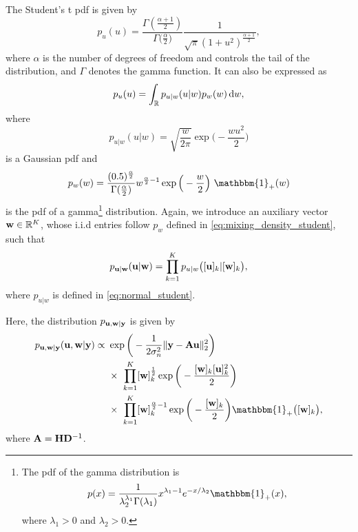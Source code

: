 \documentclass[journal]{IEEEtran}
\begin{document}
The Student's t pdf is given by 
\begin{equation}\label{eq:pdf_student}
    p_u(u) = \frac{\Gamma(\frac{\alpha+1}{2})}{\Gamma\big(\frac{\alpha}{2}\big)}\frac{1}{\sqrt{\pi}(1 + u^2)^{\frac{\alpha+1}{2}}},
\end{equation}
where $\alpha$ is the number of degrees of freedom and controls the tail of the distribution, and $\Gamma$ denotes the gamma function. It can also be expressed as 
\begin{equation}
    p_u(u) = \int_{\mathbb{R}} p_{u|w}(u|w) p_w(w) \,\mathrm{d} w,
\end{equation}
where
\begin{equation}\label{eq:normal_student}
    p_{u|w}(u|w) = \sqrt{\frac{w}{2 \pi}} \exp\bigg(- \frac{w u^2}{2}\bigg)
\end{equation}
is a Gaussian pdf and  
\begin{equation}\label{eq:mixing_density_student}
    p_w(w) = \frac{(0.5)^{\frac{\alpha}{2}}}{\Gamma(\frac{\alpha}{2})}w^{\frac{\alpha}{2}-1} \exp{\Big(-\frac{w}{2}\Big)} \ \mathbbm{1}_{+}(w)
\end{equation}
is the pdf of a gamma\footnote{The pdf of the gamma distribution is \begin{equation*} p(x) = \frac{1}{\lambda_2^{\lambda_1} \Gamma(\lambda_1)}x^{\lambda_1-1}e^{-x/\lambda_2} \mathbbm{1}_{+}(x), \end{equation*} where $\lambda_1 > 0$ and $\lambda_2 > 0$.} distribution. Again, we introduce an auxiliary vector ${\bf{w}} \in \mathbb{R}^K$, whose i.i.d entries follow $p_w$ defined in \eqref{eq:mixing_density_student}, such that 
\begin{equation}\label{eq:aux_var_property_student}
    p_{{\bf{u}} | {\bf{w}}}({\bf{u}} | {\bf{w}}) = \prod_{k=1}^{K} p_{u|w}\big([{\bf{u}}]_k | [{\bf{w}}]_k\big),
\end{equation}
where $p_{u|w}$ is defined in \eqref{eq:normal_student}.

Here, the distribution $p_{{\bf{u}}, {\bf{w}} | {\bf{y}}}$ is given by
\begin{align}\label{eq:conditional_joint_distribution_student}
    p_{\M u, \M w | \M y}(\M u, \M w | \M y) \propto \ &\exp\bigg(-\frac{1}{2 \sigma_n^2} \|\M y - \M A \M u \|_{2}^{2}\bigg) \nonumber \\
    &\times \ \prod_{k=1}^{K}[\M w]_k^{\frac{1}{2}} \exp\bigg(-\frac{[\M w]_k [\M u]_k^2}{2}\bigg) \nonumber \\
    &\times \ \prod_{k=1}^{K} [\M w]_k^{\frac{\alpha}{2} - 1} \exp{\bigg(-\frac{[\M w]_k}{2}\bigg)} \mathbbm{1}_{+}\big([\M w]_k\big),
\end{align}
where ${\bf{A}} = {\bf{H}} {\bf{D}}^{-1}$. 
\end{document}
